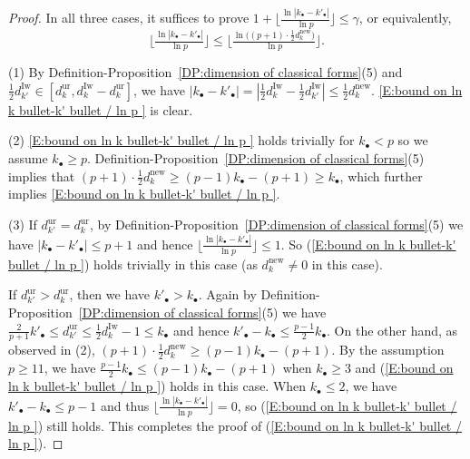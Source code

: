 \documentclass[12pt]{amsart}
\theoremstyle{definition}
\numberwithin{equation}{subsection}
\newcommand{\new}{\mathrm{new}}
\newcommand{\Iw}{\mathrm{Iw}}
\newcommand{\ur}{\mathrm{ur}}
\begin{document}
\begin{proof}
In all three cases, it suffices to prove $1+\lfloor \frac{\ln |k_\bullet-k'_\bullet|}{\ln p}\rfloor \leq \gamma$, or equivalently, 
\begin{equation}
\label{E:bound on ln k bullet-k' bullet / ln p }
\Big\lfloor \tfrac{\ln |k_\bullet-k'_\bullet|}{\ln p} \Big\rfloor \leq \Big\lfloor \tfrac {\ln \big((p+1)\cdot \tfrac 12 d_k^\new \big)}{\ln p} \Big\rfloor.
\end{equation}

(1) By Definition-Proposition~\ref{DP:dimension of classical forms}(5) and $\frac 12 d_{k'}^\Iw\in [d_k^\ur,d_k^\Iw-d_k^\ur]$,  we have $|k_\bullet-k'_{\bullet}|=|\frac 12 d_k^\Iw-\frac 12 d_{k'}^\Iw|\leq \tfrac 12 d_k^\new$. \eqref{E:bound on ln k bullet-k' bullet / ln p } is clear.

(2) \eqref{E:bound on ln k bullet-k' bullet / ln p } holds trivially for $k_\bullet<p$ so we assume $k_\bullet \geq p$. Definition-Proposition~\ref{DP:dimension of classical forms}(5) implies that $(p+1)\cdot \frac 12 d_k^\new \geq (p-1)k_\bullet-(p+1)\geq k_\bullet$, which further implies \eqref{E:bound on ln k bullet-k' bullet / ln p }.

(3) If $d_{k'}^\ur=d_k^\ur$, by Definition-Proposition~\ref{DP:dimension of classical forms}(5) we have $|k_\bullet-k'_\bullet|\leq p+1$ and hence $\lfloor \frac{\ln |k_\bullet-k'_\bullet|}{\ln p} \rfloor \leq 1$. So (\ref{E:bound on ln k bullet-k' bullet / ln p }) holds trivially in this case (as $d_k^\new \neq 0$ in this case).
				
If $d_{k'}^\ur>d_k^\ur$, then we have $k'_\bullet>k_\bullet$. Again by Definition-Proposition~\ref{DP:dimension of classical forms}(5) we have $\frac{2}{p+1}k'_\bullet\leq d_{k'}^\ur\leq \frac 12 d_k^\Iw-1\leq k_\bullet$ and hence $k'_\bullet-k_\bullet\leq \frac{p-1}2 k_\bullet$. On the other hand, as observed in (2), $(p+1)\cdot \frac 12 d_k^\new \geq (p-1)k_\bullet-(p+1)$. By the assumption $p\geq 11$, we have $\frac{p-1}{2}k_\bullet\leq (p-1)k_\bullet-(p+1)$ when $k_\bullet \geq 3$ and (\ref{E:bound on ln k bullet-k' bullet / ln p }) holds in this case. When $k_\bullet \leq 2$,  we have $k'_\bullet-k_\bullet\leq p-1$ and thus $\lfloor \frac{\ln |k_\bullet-k'_\bullet|}{\ln p} \rfloor=0$, so (\ref{E:bound on ln k bullet-k' bullet / ln p }) still holds. This completes the proof of (\ref{E:bound on ln k bullet-k' bullet / ln p }).
\end{proof}
\end{document}
